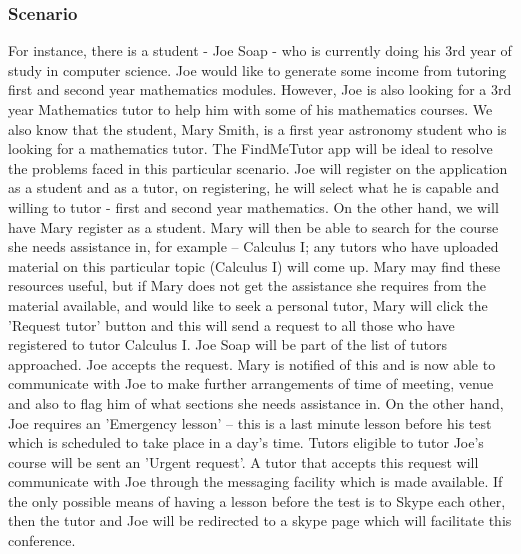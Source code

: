 \documentclass[12pt]{article}
\begin{document}
\subsubsection{Scenario}
\begin{flushleft}
For instance, there is a student - Joe Soap - who is currently doing his  3rd year of study in computer science.  Joe would like to generate some income from tutoring first and second year mathematics modules. However, Joe is also looking for a 3rd year Mathematics tutor to help him with some of his mathematics courses. We also know that the student, Mary Smith, is a first year astronomy student who is looking for a mathematics tutor. The FindMeTutor app will be ideal to resolve the problems faced in this particular scenario. Joe will register on the application as a student and as a tutor, on registering, he will select what he is capable and willing to tutor - first and second year mathematics. On the other hand, we will have Mary register as a student. Mary will then be able to search for the course she needs assistance in, for example – Calculus I; any tutors who have uploaded material on this particular topic (Calculus I) will come up. Mary may find these resources useful, but if Mary does not get the assistance she requires from the material available, and would like to seek a personal tutor, Mary will click the 'Request tutor' button and this will send a request to all those who have registered to tutor Calculus I. Joe Soap will be part of the list of tutors approached. Joe accepts the request. Mary is notified of this and is now able to communicate with Joe to make further arrangements of time of meeting, venue and also to flag him of what sections she needs assistance in. On the other hand, Joe requires an 'Emergency lesson' – this is a last minute lesson before his test which is scheduled to take place in a day's time. Tutors eligible to tutor Joe's course will be sent an 'Urgent request'. A tutor that accepts this request will communicate with Joe through the messaging facility which is made available. If the only possible means of having a lesson before the test is to Skype each other, then the tutor and Joe will be redirected to a skype page which will facilitate this conference.
\end{flushleft}
\end{document}

